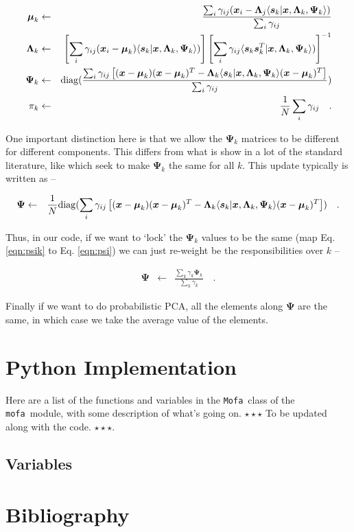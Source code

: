 \documentclass[letterpaper,12pt]{article}
\newcommand{\mofa}{\texttt{mofa}}
\newcommand{\Mofa}{\texttt{Mofa}}
\newcommand{\vect}[1]{\boldsymbol{#1}}
\newcommand{\data}{\vect{x}}
\newcommand{\latent}{\vect{s}}
\newcommand{\mean}{\vect{\mu}}
\newcommand{\lmda}{\vect{\Lambda}}
\newcommand{\ps}{\vect{\Psi}}
\begin{document}
\begin{eqnarray}\displaystyle
\mean_k &\leftarrow& \frac{\sum_i\gamma_{ij}(\data_i-{\lmda_j \langle\latent_k|\data,\lmda_k,\ps_k\rangle})}{\sum_i\gamma_{ij}} \\
\lmda_k &\leftarrow& \left[ \sum_i\gamma_{ij}(\data_i- \mean_k)\langle\latent_k|\data,\lmda_k,\ps_k\rangle) \right]  \left[ \sum_i\gamma_{ij}\langle\latent_k\latent_k^T|\data,\lmda_k,\ps_k\rangle) \right]^{-1}\\
\label{eqn:psik}
\ps_k &\leftarrow& {\rm diag}(\frac{\sum_i\gamma_{ij}\left[(\data-\mean_k)(\data-\mean_k)^T-\lmda_k \langle\latent_k|\data,\lmda_k,\ps_k\rangle(\data-\mean_k)^T\right]}{\sum_i\gamma_{ij}}) \\
\pi_k &\leftarrow& \frac{1}{N}\sum_i\gamma_{ij}
\quad .
\end{eqnarray}

One important distinction here is that we allow the $\ps_k$ matrices to be different for 
different components.  This differs from what is show in a lot of the standard literature, 
like \citet{ghahramani96} which seek to make $\ps_k$ the same for all $k$.  This update 
typically is written as --

\begin{eqnarray}\displaystyle
\label{eqn:psi}
\ps &\leftarrow& \frac{1}{N}{\rm diag}(\sum_i\gamma_{ij}\left[(\data-\mean_k)(\data-\mean_k)^T-\lmda_k \langle\latent_k|\data,\lmda_k,\ps_k\rangle(\data-\mean_k)^T\right]) 
\quad .
\end{eqnarray}

Thus, in our code, if we want to `lock' the $\ps_k$ values to be the same (map Eq. 
\ref{eqn:psik} to Eq. \ref{eqn:psi}) we can just re-weight be the responsibilities 
over $k$ --

\begin{eqnarray}\displaystyle
\ps &\leftarrow& \frac{\sum_k \gamma_k \ps_k}{\sum_k \gamma_k } 
\quad .
\end{eqnarray}

Finally if we want to do probabilistic PCA, all the elements along $\ps$ are the same, 
in which case we take the average value of the elements.

\section{Python Implementation}

Here are a list of the functions and variables in the \Mofa\ class of
the \mofa\ module, with some description of what's going on.
$\star\star\star$ To be updated along with the
code. $\star\star\star$.

\subsection{Variables}

\texttt{}

\section{Bibliography}
\end{document}

